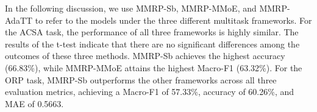 \documentclass[preprint,12pt]{elsarticle}
\begin{document}
\begin{table}[htp]
    \centering
    \caption{image numberask framework selection}
    \label{table:multitask}
\end{table}
In the following discussion, we use MMRP-Sb, MMRP-MMoE, and MMRP-AdaTT to refer to the models under the three different multitask frameworks. For the ACSA task, the performance of all three frameworks is highly similar. The results of the t-test indicate that there are no significant differences among the outcomes of these three methods. MMRP-Sb achieves the highest accuracy (66.83\%), while MMRP-MMoE attains the highest Macro-F1 (63.32\%). For the ORP task, MMRP-Sb outperforms the other frameworks across all three evaluation metrics, achieving a Macro-F1 of 57.33\%, accuracy of 60.26\%, and MAE of 0.5663.
\end{document}
